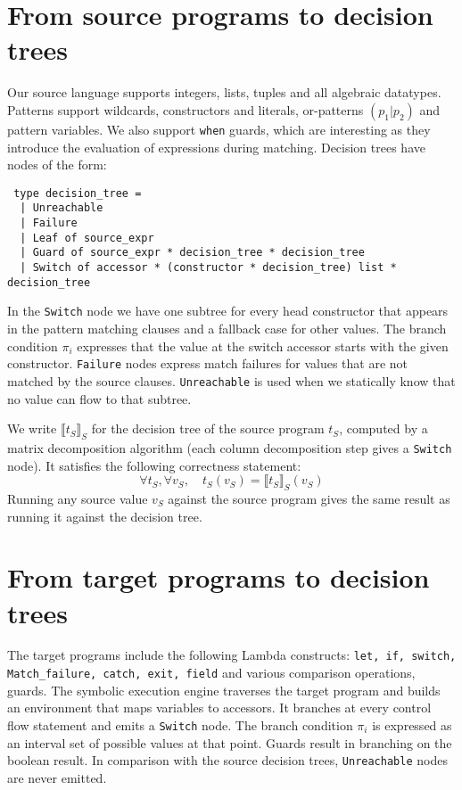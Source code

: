 \documentclass[12pt]{article}
\newcommand{\sem}[1]{{\llbracket{#1}\rrbracket}}
\begin{document}
\section{From source programs to decision trees}
Our source language supports integers, lists, tuples and all algebraic
datatypes. Patterns support wildcards, constructors and literals,
or-patterns $(p_1 | p_2)$ and pattern variables.  We also support
\texttt{when} guards, which are interesting as they introduce the
evaluation of expressions during matching.  Decision trees have nodes
of the form:
\begin{lstlisting}
 type decision_tree =
  | Unreachable
  | Failure
  | Leaf of source_expr
  | Guard of source_expr * decision_tree * decision_tree
  | Switch of accessor * (constructor * decision_tree) list * decision_tree
\end{lstlisting}
In the \texttt{Switch} node we have one subtree for every head constructor
that appears in the pattern matching clauses and a fallback case for
other values. The branch condition $\pi_i$ expresses that the value at the
switch accessor starts with the given constructor.
\texttt{Failure} nodes express match failures for values that are not
matched by the source clauses.
\texttt{Unreachable} is used when we statically know that no value
can flow to that subtree.

We write $\sem{t_S}_S$ for the decision tree of the source program
$t_S$, computed by a matrix decomposition algorithm (each column
decomposition step gives a \texttt{Switch} node).
It satisfies the following correctness statement:
\[
\forall t_S, \forall v_S, \quad t_S(v_S) = \sem{t_S}_S(v_S)
\]
Running any source value $v_S$ against the source program gives the
same result as running it against the decision tree.


\section{From target programs to decision trees}
The target programs include the following Lambda constructs:
\texttt{let, if, switch, Match\_failure, catch, exit, field} and
various comparison operations, guards. The symbolic execution engine
traverses the target program and builds an environment that maps
variables to accessors. It branches at every control flow statement
and emits a \texttt{Switch} node. The branch condition $\pi_i$ is expressed as
an interval set of possible values at that point.
%
Guards result in branching on the boolean result.
%
In comparison with the source decision trees, \texttt{Unreachable}
nodes are never emitted.
\end{document}
